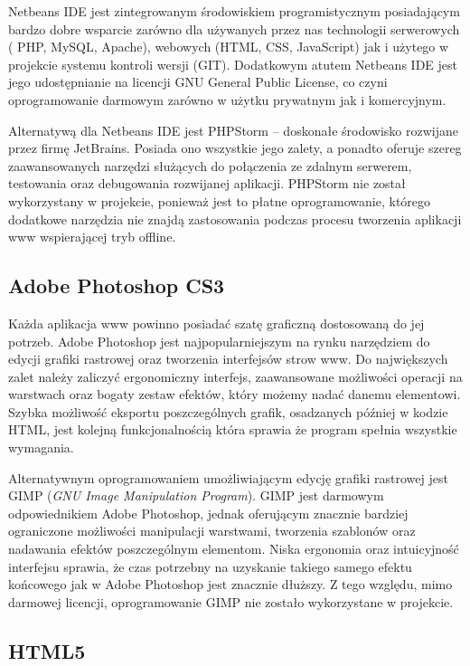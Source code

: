 Netbeans IDE jest zintegrowanym środowiskiem programistycznym posiadającym bardzo dobre wsparcie zarówno dla używanych przez nas technologii serwerowych ( PHP, MySQL, Apache), webowych (HTML, CSS, JavaScript) jak i użytego w projekcie systemu kontroli wersji (GIT). Dodatkowym atutem Netbeans IDE jest jego udostępnianie na licencji GNU General Public License, co czyni oprogramowanie darmowym zarówno w użytku prywatnym jak i komercyjnym.

Alternatywą dla Netbeans IDE jest PHPStorm -- doskonałe środowisko rozwijane przez firmę JetBrains. Posiada ono wszystkie jego zalety, a ponadto oferuje szereg zaawansowanych narzędzi służących do połączenia ze zdalnym serwerem, testowania oraz debugowania rozwijanej aplikacji. PHPStorm nie został wykorzystany w projekcie, ponieważ jest to płatne oprogramowanie, którego dodatkowe narzędzia nie znajdą zastosowania podczas procesu tworzenia aplikacji www wspierającej tryb offline.

\subsection{Adobe Photoshop CS3}
\label{sec:photoshop}

Każda aplikacja www powinno posiadać szatę graficzną dostosowaną do jej potrzeb. Adobe Photoshop jest najpopularniejszym na rynku narzędziem do edycji grafiki rastrowej oraz tworzenia interfejsów strow www. Do największych zalet należy zaliczyć ergonomiczny interfejs, zaawansowane możliwości operacji na warstwach oraz bogaty zestaw efektów, który możemy nadać danemu elementowi. Szybka możliwość eksportu poszczególnych grafik, osadzanych później w kodzie HTML, jest kolejną funkcjonalnością która sprawia że program spełnia wszystkie wymagania.

Alternatywnym oprogramowaniem umożliwiającym edycję grafiki rastrowej jest GIMP (\emph{GNU Image Manipulation Program}). GIMP jest darmowym odpowiednikiem Adobe Photoshop, jednak oferującym znacznie bardziej ograniczone możliwości manipulacji warstwami, tworzenia szablonów oraz nadawania efektów poszczególnym elementom. Niska ergonomia oraz intuicyjność interfejsu sprawia, że czas potrzebny na uzyskanie takiego samego efektu końcowego jak w Adobe Photoshop jest znacznie dłuższy. Z tego względu, mimo darmowej licencji, oprogramowanie GIMP nie zostało wykorzystane w projekcie.

\subsection{HTML5}
\label{sec:html5}

